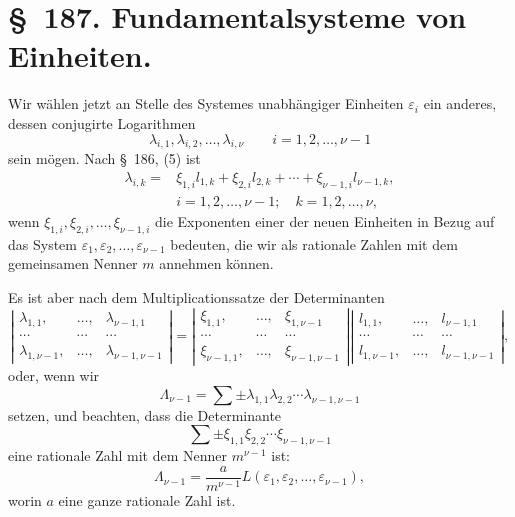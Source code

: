 \documentclass[11pt]{article}
\begin{document}
\section*{\S~187. Fundamentalsysteme von Einheiten.}

Wir wählen jetzt an Stelle des Systemes unabhängiger Einheiten $\varepsilon_i$ ein anderes, dessen conjugirte Logarithmen
\begin{equation}
\lambda_{i,1},\lambda_{i,2},\ldots,\lambda_{i,\nu}
\qquad i=1,2,\ldots,\nu-1
\tag{1}
\end{equation}
sein mögen. Nach \S~186, (5) ist
\begin{equation}
\begin{array}{rl}
\lambda_{i,k}={}&\xi_{1,i}l_{1,k}+\xi_{2,i}l_{2,k}+\cdots+\xi_{\nu-1,i}l_{\nu-1,k},\\[2pt]
&i=1,2,\ldots,\nu-1;\quad k=1,2,\ldots,\nu,
\end{array}
\tag{2}
\end{equation}
wenn $\xi_{1,i},\xi_{2,i},\ldots,\xi_{\nu-1,i}$ die Exponenten einer der neuen Einheiten in Bezug auf das System $\varepsilon_1,\varepsilon_2,\ldots,\varepsilon_{\nu-1}$ bedeuten, die wir als rationale Zahlen mit dem gemeinsamen Nenner $m$ annehmen können.

Es ist aber nach dem Multiplicationssatze der Determinanten
\begin{equation}
\left|\begin{array}{ccc}
\lambda_{1,1},&\ldots,&\lambda_{\nu-1,1}\\
\cdots&\cdots&\cdots\\
\lambda_{1,\nu-1},&\ldots,&\lambda_{\nu-1,\nu-1}
\end{array}\right|
=
\left|\begin{array}{ccc}
\xi_{1,1},&\ldots,&\xi_{1,\nu-1}\\
\cdots&\cdots&\cdots\\
\xi_{\nu-1,1},&\ldots,&\xi_{\nu-1,\nu-1}
\end{array}\right|
\left|\begin{array}{ccc}
l_{1,1},&\ldots,&l_{\nu-1,1}\\
\cdots&\cdots&\cdots\\
l_{1,\nu-1},&\ldots,&l_{\nu-1,\nu-1}
\end{array}\right|,
\tag{3}
\end{equation}
oder, wenn wir
\[
\Lambda_{\nu-1}=\sum\pm\lambda_{1,1}\lambda_{2,2}\cdots\lambda_{\nu-1,\nu-1}
\]
setzen, und beachten, dass die Determinante
\[
\sum\pm\xi_{1,1}\xi_{2,2}\cdots\xi_{\nu-1,\nu-1}
\]
eine rationale Zahl mit dem Nenner $m^{\nu-1}$ ist:
\begin{equation}
\Lambda_{\nu-1}=\frac{a}{m^{\nu-1}}L(\varepsilon_1,\varepsilon_2,\ldots,\varepsilon_{\nu-1}),
\tag{4}
\end{equation}
worin $a$ eine ganze rationale Zahl ist.
\end{document}
